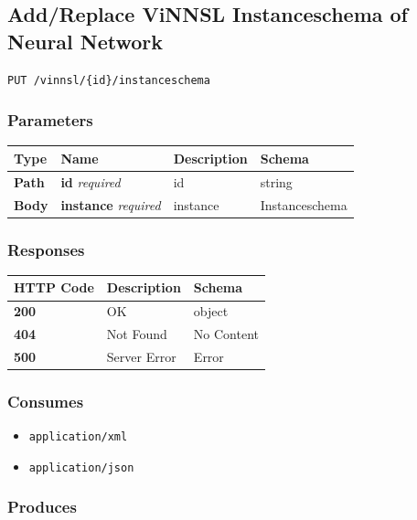 \subsection{Add/Replace ViNNSL Instanceschema of Neural
Network}\label{addreplace-vinnsl-instanceschema-of-neural-network}

\begin{verbatim}
PUT /vinnsl/{id}/instanceschema
\end{verbatim}

\subsubsection{Parameters}\label{parameters-5}

\begin{longtable}[]{@{}llll@{}}
\toprule
Type & Name & Description & Schema\tabularnewline
\midrule
\endhead
\textbf{Path} & \textbf{id} \emph{required} & id & string\tabularnewline
\textbf{Body} & \textbf{instance} \emph{required} & instance &
Instanceschema\tabularnewline
\bottomrule
\end{longtable}

\subsubsection{Responses}\label{responses-7}

\begin{longtable}[]{@{}lll@{}}
\toprule
HTTP Code & Description & Schema\tabularnewline
\midrule
\endhead
\textbf{200} & OK & object\tabularnewline
\textbf{404} & Not Found & No Content\tabularnewline
\textbf{500} & Server Error & Error\tabularnewline
\bottomrule
\end{longtable}

\subsubsection{Consumes}\label{consumes-3}

\begin{itemize}
\tightlist
\item
  \texttt{application/xml}
\item
  \texttt{application/json}
\end{itemize}

\subsubsection{Produces}\label{produces-7}

